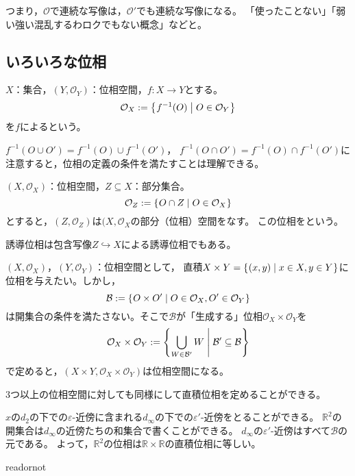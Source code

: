 \documentclass[uplatex]{jsarticle}
\begin{document}
つまり，$\mathcal{O}$で連続な写像は，$\mathcal{O}'$でも連続な写像になる。
{\footnotesize「使ったことない」「弱い強い混乱するわロクでもない概念」などと。}

\subsection{いろいろな位相}

\begin{teigi}[誘導位相]
  $X$：集合，$(Y,\mathcal{O}_{Y})$：位相空間，$f \colon X \longrightarrow Y$とする。
  \begin{equation}
    \mathcal{O}_{X} := \Set{\hspace{-1.8pt} f^{-1}(O) | O \in \mathcal{O}_{Y} \hspace{-1.8pt}}
  \end{equation}
  を$f$によるという。
\end{teigi}

$f^{-1} (O \cup O') = f^{-1} (O) \cup f^{-1} (O')$，
$f^{-1} (O \cap O') = f^{-1} (O) \cap f^{-1} (O')$に注意すると，位相の定義の条件を満たすことは理解できる。

\begin{teigi}[相対位相]
  $(X, \mathcal{O}_{X})$：位相空間，$Z \subseteq X$：部分集合。
  \begin{equation}
    \mathcal{O}_{Z} := \Set{\hspace{-1.8pt} O \cap Z | O \in \mathcal{O}_{X} \hspace{-1.8pt}}
  \end{equation}
  とすると，$(Z, \mathcal{O}_{Z})$は$(X, \mathcal{O}_{X}$の部分（位相）空間をなす。
  この位相をという。
\end{teigi}

誘導位相は包含写像$Z \hookrightarrow X$による誘導位相でもある。

\sukima {}

$(X, \mathcal{O}_{X})$，$(Y, \mathcal{O}_{Y})$：位相空間として，
直積$X \times Y = \Set{\hspace{-1.8pt} (x,y) | x \in X, y \in Y \hspace{-1.8pt}}$に位相を与えたい。しかし，
\begin{equation}
  \mathcal{B} := \Set{\hspace{-1.8pt} O \times O' | O \in \mathcal{O}_{X}, O' \in \mathcal{O}_{Y} \hspace{-1.8pt}}
\end{equation}
は開集合の条件を満たさない。そこで$\mathcal{B}$が「生成する」位相$\mathcal{O}_{X} \times \mathcal{O}_{Y}$を
\begin{equation}
  \mathcal{O}_{X} \times \mathcal{O}_{Y} := \Set{\hspace{-1.8pt}  \bigcup_{W \in \mathcal{B}'} W | \mathcal{B}' \subseteq \mathcal{B} \hspace{-1.8pt}}
\end{equation}
で定めると，$(X \times Y, \mathcal{O}_{X} \times \mathcal{O}_{Y})$は位相空間になる。

3つ以上の位相空間に対しても同様にして直積位相を定めることができる。

\begin{rei}
  $x$の$d_{2}$の下での$\varepsilon$-近傍に含まれる$d_{\infty}$の下での$\varepsilon'$-近傍をとることができる。
  $\mathbb{R}^{2}$の開集合は$d_{\infty}$の近傍たちの和集合で書くことができる。
  $d_{\infty}$の$\varepsilon'$-近傍はすべて$\mathcal{B}$の元である。
  よって，$\mathbb{R}^{2}$の位相は$\mathbb{R} \times \mathbb{R}$の直積位相に等しい。
\end{rei}

\expandafter\ifx\csname readornot\endcsname\relax
  
\end{document}
